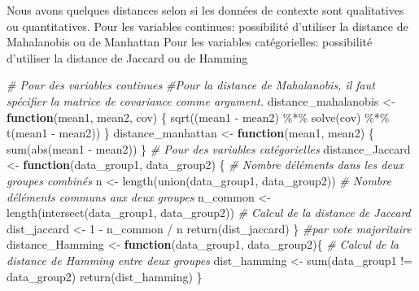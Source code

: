 \documentclass[
]{article}
\newenvironment{Shaded}{\begin{snugshade}}{\end{snugshade}}
\newcommand{\CommentTok}[1]{\textcolor[rgb]{0.56,0.35,0.01}{\textit{#1}}}
\newcommand{\ControlFlowTok}[1]{\textcolor[rgb]{0.13,0.29,0.53}{\textbf{#1}}}
\newcommand{\DecValTok}[1]{\textcolor[rgb]{0.00,0.00,0.81}{#1}}
\newcommand{\FunctionTok}[1]{\textcolor[rgb]{0.00,0.00,0.00}{#1}}
\newcommand{\NormalTok}[1]{#1}
\newcommand{\OtherTok}[1]{\textcolor[rgb]{0.56,0.35,0.01}{#1}}
\newcommand{\SpecialCharTok}[1]{\textcolor[rgb]{0.00,0.00,0.00}{#1}}
\begin{document}
Nous avons quelques distances selon si les données de contexte sont
qualitatives ou quantitatives. Pour les variables continues: possibilité
d'utiliser la distance de Mahalanobis ou de Manhattan Pour les variables
catégorielles: possibilité d'utiliser la distance de Jaccard ou de
Hamming

\begin{Shaded}
\begin{Highlighting}[]
\CommentTok{\# Pour des variables continues}
\CommentTok{\#Pour la distance de Mahalanobis, il faut spécifier la matrice de covariance comme argument.}
\NormalTok{distance\_mahalanobis }\OtherTok{\textless{}{-}} \ControlFlowTok{function}\NormalTok{(mean1, mean2, cov) \{}
  \FunctionTok{sqrt}\NormalTok{((mean1 }\SpecialCharTok{{-}}\NormalTok{ mean2) }\SpecialCharTok{\%*\%} \FunctionTok{solve}\NormalTok{(cov) }\SpecialCharTok{\%*\%} \FunctionTok{t}\NormalTok{(mean1 }\SpecialCharTok{{-}}\NormalTok{ mean2))}
\NormalTok{\}}
\NormalTok{distance\_manhattan }\OtherTok{\textless{}{-}} \ControlFlowTok{function}\NormalTok{(mean1, mean2) \{}
  \FunctionTok{sum}\NormalTok{(}\FunctionTok{abs}\NormalTok{(mean1 }\SpecialCharTok{{-}}\NormalTok{ mean2))}
\NormalTok{\}}
\CommentTok{\# Pour des variables catégorielles}
\NormalTok{distance\_Jaccard }\OtherTok{\textless{}{-}} \ControlFlowTok{function}\NormalTok{(data\_group1, data\_group2) \{}
  \CommentTok{\# Nombre d\textquotesingle{}éléments dans les deux groupes combinés}
\NormalTok{  n }\OtherTok{\textless{}{-}} \FunctionTok{length}\NormalTok{(}\FunctionTok{union}\NormalTok{(data\_group1, data\_group2))}
  \CommentTok{\# Nombre d\textquotesingle{}éléments communs aux deux groupes}
\NormalTok{  n\_common }\OtherTok{\textless{}{-}} \FunctionTok{length}\NormalTok{(}\FunctionTok{intersect}\NormalTok{(data\_group1, data\_group2))}
  \CommentTok{\# Calcul de la distance de Jaccard}
\NormalTok{  dist\_jaccard }\OtherTok{\textless{}{-}} \DecValTok{1} \SpecialCharTok{{-}}\NormalTok{ n\_common }\SpecialCharTok{/}\NormalTok{ n}
  \FunctionTok{return}\NormalTok{(dist\_jaccard)}
\NormalTok{\}}
\CommentTok{\#par vote majoritaire}
\NormalTok{distance\_Hamming }\OtherTok{\textless{}{-}} \ControlFlowTok{function}\NormalTok{(data\_group1, data\_group2)\{}
  \CommentTok{\# Calcul de la distance de Hamming entre deux groupes}
\NormalTok{  dist\_hamming }\OtherTok{\textless{}{-}} \FunctionTok{sum}\NormalTok{(data\_group1 }\SpecialCharTok{!=}\NormalTok{ data\_group2)}
  \FunctionTok{return}\NormalTok{(dist\_hamming)}
\NormalTok{\}}
\end{Highlighting}
\end{Shaded}
\end{document}
